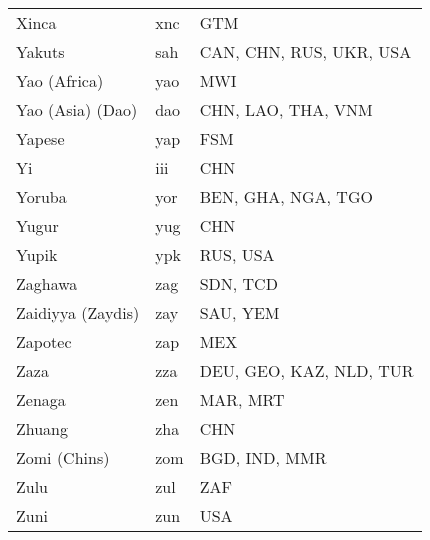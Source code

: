 \documentclass[12pt]{article}
\begin{document}
\begin{center}
\begin{longtable}{|p{7cm}|p{1cm}|p{7cm}|}
Xinca	&	xnc	&	GTM	\\	\cline{1-3}
Yakuts	&	sah 	&	CAN, CHN, RUS, UKR, USA	\\	\cline{1-3}
Yao (Africa)	&	yao 	&	MWI	\\	\cline{1-3}
Yao (Asia) (Dao)	&	dao	&	CHN, LAO, THA, VNM	\\	\cline{1-3}
Yapese	&	yap 	&	FSM	\\	\cline{1-3}
Yi	&	iii 	&	CHN	\\	\cline{1-3}
Yoruba	&	yor 	&	BEN, GHA, NGA, TGO	\\	\cline{1-3}
Yugur	&	yug	&	CHN	\\	\cline{1-3}
Yupik	&	ypk 	&	RUS, USA	\\	\cline{1-3}
Zaghawa	&	zag	&	SDN, TCD	\\	\cline{1-3}
Zaidiyya (Zaydis)	&	zay	&	SAU, YEM	\\	\cline{1-3}
Zapotec	&	zap 	&	MEX	\\	\cline{1-3}
Zaza	&	zza 	&	DEU, GEO, KAZ, NLD, TUR	\\	\cline{1-3}
Zenaga	&	zen 	&	MAR, MRT	\\	\cline{1-3}
Zhuang	&	zha 	&	CHN	\\	\cline{1-3}
Zomi (Chins)	&	zom	&	BGD, IND, MMR	\\	\cline{1-3}
Zulu	&	zul 	&	ZAF	\\	\cline{1-3}
Zuni	&	zun 	&	USA	\\	\cline{1-3}
\end{longtable}
\end{center}
\end{document}
